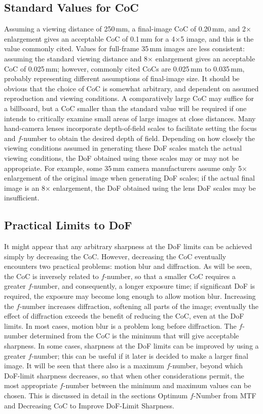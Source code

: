 \documentclass[11pt, oneside]{scrartcl}   	%
\begin{document}
\subsection{Standard Values for CoC}
Assuming a viewing distance of 250\,mm, a final-image CoC of 0.20\,mm, and 2$\times$ enlargement gives an acceptable CoC of 0.1\,mm for a 4$\times$5 image, and this is the value commonly cited. Values for full-frame 35\,mm images are less consistent: assuming the standard viewing distance and 8$\times$ enlargement gives an acceptable CoC of 0.025\,mm; however, commonly cited CoCs are 0.025\,mm to 0.035\,mm, probably representing different assumptions of final-image size. It should be obvious that the choice of CoC is somewhat arbitrary, and dependent on assumed reproduction and viewing conditions. A comparatively large CoC may suffice for a billboard, but a CoC smaller than the standard value will be required if one intends to critically examine small areas of large images at close distances.
Many hand-camera lenses incorporate depth-of-field scales to facilitate setting the focus and $f$-number to obtain the desired depth of field. Depending on how closely the viewing conditions assumed in generating these DoF scales match the actual viewing conditions, the DoF obtained using these scales may or may not be appropriate. For example, some 35\,mm camera manufacturers assume only 5$\times$ enlargement of the original image when generating DoF scales; if the actual final image is an 8$\times$ enlargement, the DoF obtained using the lens DoF scales may be insufficient.

\subsection{Practical Limits to DoF}

It might appear that any arbitrary sharpness at the DoF limits can be achieved simply by decreasing the CoC. However, decreasing the CoC eventually encounters two practical problems: motion blur and diffraction. As will be seen, the CoC is inversely related to $f$-number, so that a smaller CoC requires a greater $f$-number, and consequently, a longer exposure time; if significant DoF is required, the exposure may become long enough to allow motion blur. Increasing the $f$-number increases diffraction, softening all parts of the image; eventually the effect of diffraction exceeds the benefit of reducing the CoC, even at the DoF limits. In most cases, motion blur is a problem long before diffraction.
The $f$-number determined from the CoC is the minimum that will give acceptable sharpness. In some cases, sharpness at the DoF limits can be improved by using a greater $f$-number; this can be useful if it later is decided to make a larger final image. It will be seen that there also is a maximum $f$-number, beyond which DoF-limit sharpness decreases, so that when other considerations permit, the most appropriate $f$-number between the minimum and maximum values can be chosen. This is discussed in detail in the sections Optimum $f$-Number from MTF and Decreasing CoC to Improve DoF-Limit Sharpness.
\end{document}
